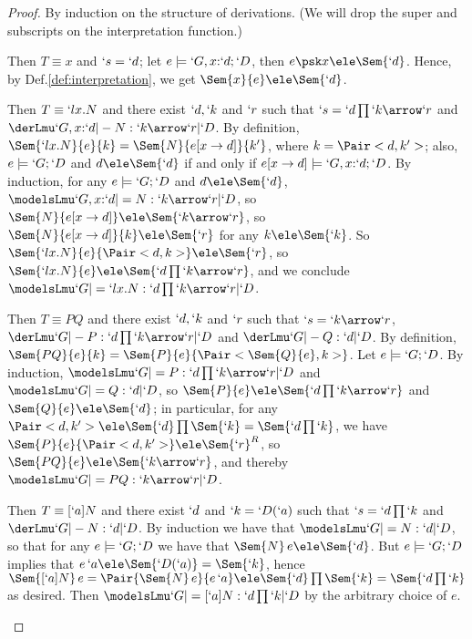 \documentclass{CSML}
\begin{document}
 \begin{proof}
By induction on the structure of derivations.
(We will drop the super and subscripts on the interpretation function.)

 \begin{description} \itemsep 3pt

 \item [$ \Axiom $] 
Then $T \equiv x$ and $`s = `d$; let $e \models `G,x{:}`d;`D $, then $e\psk x \ele \Sem{`d}$. 
Hence, by Def.\skp\ref{def:interpretation}, we get $ \Sem{ x }{ e } \ele \Sem{`d}$.

 \item [$ \LAbs $] 
Then $T \equiv `lx.N$ and there exist $`d, `k$ and $`r$ such that $ `s = `d\prod `k\arrow `r$ and $ \derLmu `G,x{:}`d |- N : `k\arrow `r | `D $.
By definition, $ \Sem{ `lx.N }{ e }{ k } = \Sem{ N }{ e[x\to d] }{ k' } $, where $k = \Pair<d,k'>$; also, $e \models `G;`D $ and $ d \ele \Sem{`d} $ if and only if $ e[x \to d] \models`G,x{:}`d;`D $.
By induction, for any $e \models `G;`D $ and $d \ele \Sem{`d}$, $ \modelsLmu `G,x{:}`d |= N : `k\arrow `r | `D $, so $ \Sem{ N }{ e[x\to d] } \ele \Sem{ `k\arrow `r }$, so $ \Sem{ N }{ e[x\to d] }{ k } \ele \Sem{ `r }$ for any $k \ele \Sem{ `k }$. 
So $ \Sem{ `lx.N }{ e }{ \Pair<d,k> } \ele \Sem{ `r }$, so $ \Sem{ `lx.N }{ e } \ele \Sem{ `d\prod `k\arrow `r}$, and we conclude $ \modelsLmu `G |= `lx.N : `d\prod `k\arrow `r | `D $. 


 \item [$ \App $] 
Then $T \equiv PQ$ and there exist $`d, `k$ and $`r$ such that $ `s = `k\arrow `r$, $ \derLmu `G |- P : `d\prod `k\arrow `r | `D $ and $ \derLmu `G |- Q : `d | `D $.
By definition, $ \Sem{ PQ }{ e }{ k } = \Sem{ P }{ e }{ \Pair< \Sem{ Q }{ e } , k > } $.
Let $e \models `G;`D $.
By induction, $ \modelsLmu `G |= P : `d\prod `k\arrow `r | `D $ and $ \modelsLmu `G |= Q : `d | `D $, so $ \Sem{ P }{ e } \ele \Sem{ `d\prod `k\arrow `r }$ and $ \Sem{ Q }{ e } \ele \Sem{`d}$; in particular, for any $ \Pair<d,k'> \ele \Sem{`d}\prod \Sem{ `k } = \Sem{ `d\prod `k }$, we have $ \Sem{ P }{ e }{ \Pair<d,k'> } \ele \Sem{ `r }^R$, so $ \Sem{ PQ }{ e } \ele \Sem{ `k\arrow `r}$, and thereby $ \modelsLmu `G |= PQ : `k\arrow `r | `D $.


 \item [$ \TCmd $] 
Then $T \equiv [`a]N$ and there exist $`d$ and $`k = `D(`a)$ such that $`s = `d\prod `k$ and $ \derLmu `G |- N : `d | `D $.
By induction we have that $ \modelsLmu `G |= N : `d | `D $, so that for any $e \models `G;`D $ we have that $\Sem{N}\,e \ele \Sem{`d}$. 
But $e \models `G;`D $ implies that $e\,`a \ele \Sem{`D(`a)} = \Sem{`k}$, hence 
$\Sem{[`a]N}\, e = \Pair{\Sem{N}\,e}{e\,`a} \ele \Sem{`d}\prod\Sem{`k} =\Sem{`d\prod`k}$ as desired. 
Then $ \modelsLmu `G |= [`a]N : `d\prod`k | `D $ by the arbitrary choice of $e$.



\end{description}
\end{proof}
\end{document}
